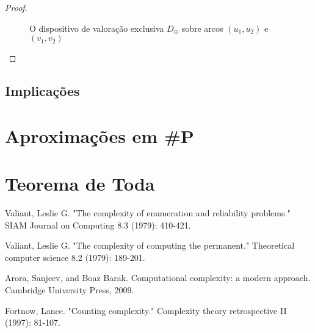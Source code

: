 \documentclass[paper=a4, fontsize=11pt]{scrartcl} %
\numberwithin{equation}{section} %
\numberwithin{figure}{section} %
\numberwithin{table}{section} %
\numberwithin{definition}{section}
\numberwithin{theorem}{section}
\newcommand{\SP}{\textbf{\#P}\xspace}
\begin{document}
\begin{proof}
\begin{figure}
\caption{O dispositivo de valoração exclusiva $D_\oplus$ sobre arcos $(u_1, u_2)$ e $(v_1, v_2)$}
\label{fig:DoplusDef}
\end{figure}
\FloatBarrier











\end{proof}




\subsection{Implicações}

\pagebreak
\section{Aproximações em \SP}

\pagebreak
\section{Teorema de Toda}


\pagebreak
\begin{thebibliography}{1}

 Valiant, Leslie G. "The complexity of enumeration and reliability problems." SIAM Journal on Computing 8.3 (1979): 410-421.

 Valiant, Leslie G. "The complexity of computing the permanent." Theoretical computer science 8.2 (1979): 189-201.

 Arora, Sanjeev, and Boaz Barak. Computational complexity: a modern approach. Cambridge University Press, 2009.

 Fortnow, Lance. "Counting complexity." Complexity theory retrospective II (1997): 81-107.

\end{thebibliography}
\end{document}
